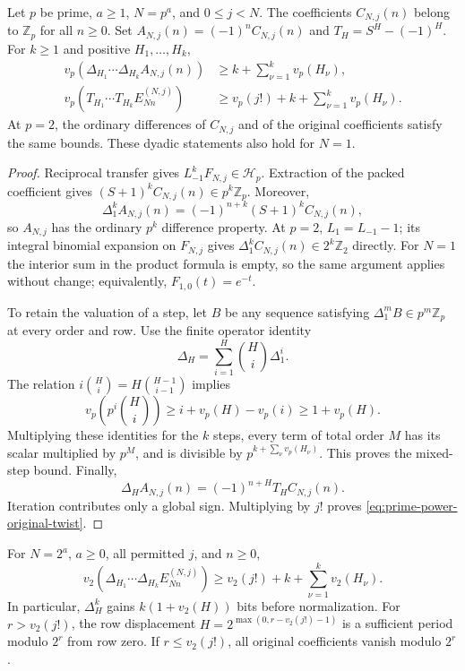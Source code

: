 \begin{theorem}
\label{thm:all-prime-power-transfer}
Let $p$ be prime, $a\geq1$, $N=p^a$, and $0\leq j<N$.
The coefficients $C_{N,j}(n)$ belong to $\mathbb Z_p$ for all $n\geq0$.
Set $A_{N,j}(n)=(-1)^n C_{N,j}(n)$ and
$T_H=S^H-(-1)^H$. For $k\geq1$ and positive $H_1,\ldots,H_k$,
\begin{align}
 v_p(\Delta_{H_1}\cdots\Delta_{H_k}A_{N,j}(n))
  &\geq k+\sum_{\nu=1}^k v_p(H_\nu),
 \label{eq:prime-power-signed-bound}\\
 v_p(T_{H_1}\cdots T_{H_k}E_{Nn}^{(N,j)})
  &\geq v_p(j!)+k+\sum_{\nu=1}^k v_p(H_\nu).
 \label{eq:prime-power-original-twist}
\end{align}
At $p=2$, the ordinary differences of $C_{N,j}$ and of the original
coefficients satisfy the same bounds. These dyadic statements also hold
for $N=1$.
\end{theorem}

\begin{proof}
Reciprocal transfer gives $L_{-1}^kF_{N,j}\in\mathcal H_p$.
Extraction of the packed coefficient gives
$(S+1)^k C_{N,j}(n)\in p^k\mathbb Z_p$. Moreover,
\[
 \Delta_1^k A_{N,j}(n)=(-1)^{n+k}(S+1)^k C_{N,j}(n),
\]
so $A_{N,j}$ has the ordinary $p^k$ difference property.
At $p=2$, $L_1=L_{-1}-1$; its integral binomial expansion on
$F_{N,j}$ gives $\Delta_1^k C_{N,j}(n)\in2^k\mathbb Z_2$ directly.
For $N=1$ the interior sum in the product formula is empty, so the same
argument applies without change; equivalently, $F_{1,0}(t)=e^{-t}$.

To retain the valuation of a step, let $B$ be any sequence satisfying
$\Delta_1^m B\in p^m\mathbb Z_p$ at every order and row. Use the finite
operator identity
\[
 \Delta_H=\sum_{i=1}^H\binom Hi\Delta_1^i.
\]
The relation $i\binom Hi=H\binom{H-1}{i-1}$ implies
\[
 v_p\left(p^i\binom Hi\right)
 \geq i+v_p(H)-v_p(i)\geq1+v_p(H).
\]
Multiplying these identities for the $k$ steps, every term of total
order $M$ has its scalar multiplied by $p^M$, and is divisible by
$p^{k+\sum_\nu v_p(H_\nu)}$. This proves the mixed-step bound.
Finally,
\[
 \Delta_H A_{N,j}(n)=(-1)^{n+H}T_H C_{N,j}(n).
\]
Iteration contributes only a global sign. Multiplying by $j!$ proves
\eqref{eq:prime-power-original-twist}.
\end{proof}

\begin{corollary}
\label{cor:all-dyadic-final}
For $N=2^a$, $a\geq0$, all permitted $j$, and $n\geq0$,
\begin{equation}
 v_2(\Delta_{H_1}\cdots\Delta_{H_k}E_{Nn}^{(N,j)})
  \geq v_2(j!)+k+\sum_{\nu=1}^k v_2(H_\nu).
 \label{eq:all-dyadic-final-bound}
\end{equation}
In particular, $\Delta_H^k$ gains $k(1+v_2(H))$ bits before normalization.
For $r>v_2(j!)$, the row displacement
$H=2^{\max(0,r-v_2(j!)-1)}$ is a sufficient period modulo $2^r$ from
row zero. If $r\leq v_2(j!)$, all original coefficients vanish modulo
$2^r$.
\end{corollary}

